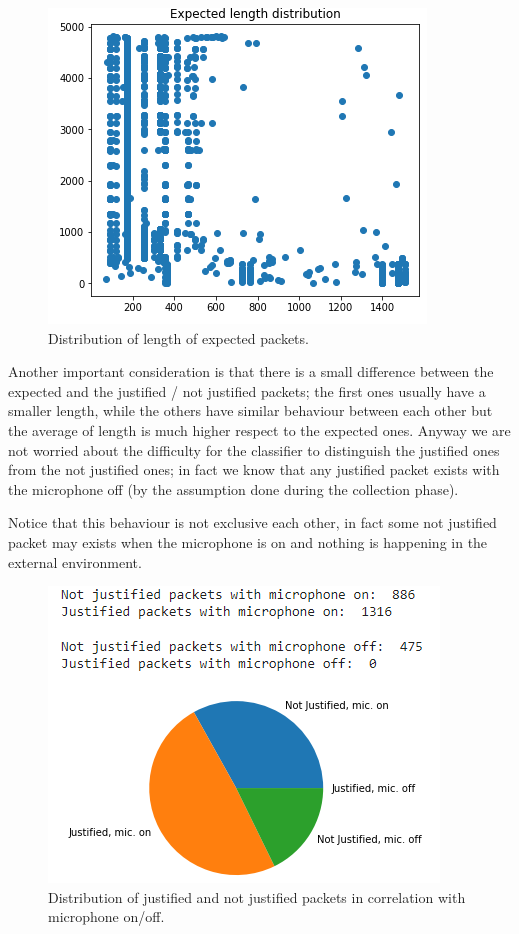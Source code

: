 \documentclass[sigconf]{acmart}
\begin{document}
    \begin{figure}[h!]
        \includegraphics[width=0.8\linewidth]{img/expected_distribution.png}
        \caption{Distribution of length of expected packets.}
        \label{fig:expected_distribution}
    \end{figure}

    Another important consideration is that there is a small difference between the expected and the justified / not justified packets; the first ones usually have a smaller length, while the others have similar behaviour between each other but the average of length is much higher respect to the expected ones.
    Anyway we are not worried about the difficulty for the classifier to distinguish the justified ones from the not justified ones; in fact we know that any justified packet exists with the microphone off (by the assumption done during the collection phase).

    Notice that this behaviour is not exclusive each other, in fact some not justified packet may exists when the microphone is on and nothing is happening in the external environment.
    \begin{figure}[h!]
        \includegraphics[width=0.8\linewidth]{img/justified_not_justified.png}
        \caption{Distribution of justified and not justified packets in correlation with microphone on/off.}
        \label{fig:justified_not_justified}
    \end{figure}
\end{document}
